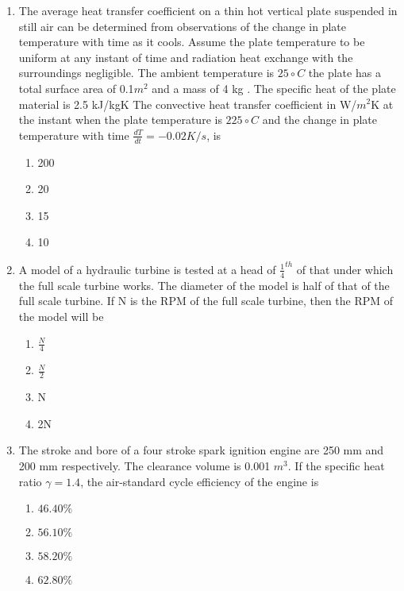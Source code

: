 \documentclass[journal]{IEEEtran}
\begin{document}
\begin{enumerate}
\begin{multicols}{4}
\begin{enumerate}
              \item 35
              \item 45
            \end{enumerate}
        \end{multicols}
        \item The average heat transfer coefficient on a thin hot vertical plate suspended in still air can be determined from observations of the change in plate temperature with time as it cools. Assume the plate temperature to be uniform at any instant of time and radiation heat exchange with the surroundings negligible. The ambient temperature is $25{\circ} C $  the plate has a total surface area of 0.1$m^2$ and a mass of 4 kg . The specific heat of the plate material is 2.5 kJ/kgK The convective heat transfer coefficient in W/$m^2$K at the instant when the plate temperature is $225{\circ}C$ and the change in plate temperature with time $\frac{dT}{dt}=-0.02K/s$, is
        \begin{multicols}{4}
            \begin{enumerate}
              \item 200
              \item  20
              \item 15
              \item 10
            \end{enumerate}
        \end{multicols}
\item A model of a hydraulic turbine is tested at a head of $\frac{1}{4}^{th}$ of that under which the full scale turbine works. The diameter of the model is half of that of the full scale turbine. If N is the RPM of the full scale turbine, then the RPM of the model will be
        \begin{multicols}{4}
            \begin{enumerate}
              \item $\frac{N}{4}$
              \item  $\frac{N}{2}$
              \item N
              \item 2N
            \end{enumerate}
        \end{multicols}
        \item  The stroke and bore of a four stroke spark ignition engine are 250 mm and 200 mm respectively. The clearance volume is 0.001 $m^3$. If the specific heat ratio $\gamma=1.4$,
        the air-standard cycle efficiency of the engine is
        \begin{multicols}{4}
        \begin{enumerate}
        \item $46.40 \%$
        \item $56.10 \%$
          \item  $58.20 \%$
          \item $62.80 \%$
          \end{enumerate}
        \end{multicols}

        
 \end{enumerate}
\end{document}
